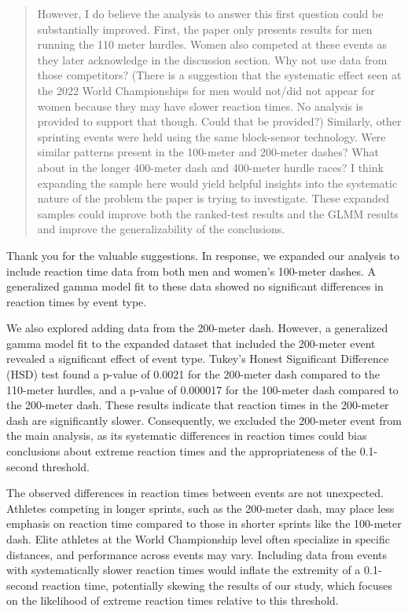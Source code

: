 \documentclass[12pt]{article}
\newenvironment{comment}%
{\begin{quotation}\noindent\small\it\color{darkblue}\ignorespaces%
}{\end{quotation}}
\begin{document}
\begin{comment}
However, I do believe the analysis to answer this first question could be
substantially improved. First, the paper only presents results for men running
the 110 meter hurdles. Women also competed at these events as they later
acknowledge in the discussion section. Why not use data from those competitors?
(There is a suggestion that the systematic effect seen at the 2022 World
Championships for men would not/did not appear for women because they may have
slower reaction times. No analysis is provided to support that though. Could
that be provided?) Similarly, other sprinting events were held using the same
block-sensor technology. Were similar patterns present in the 100-meter and
200-meter dashes? What about in the longer 400-meter dash and 400-meter hurdle
races? I think expanding the sample here would yield helpful insights into the
systematic nature of the problem the paper is trying to investigate. These
expanded samples could improve both the ranked-test results and the GLMM results
and improve the generalizability of the conclusions.
\end{comment}


Thank you for the valuable suggestions. In response, we expanded our
analysis to include reaction time data from both men and women's
100-meter dashes. A generalized gamma model fit to these data showed
no significant differences in reaction times by event type.


We also explored adding data from the 200-meter dash. However, a
generalized gamma model fit to the expanded dataset that included the
200-meter event revealed a significant effect of event type. Tukey’s
Honest Significant Difference (HSD) test found a p-value of 0.0021 for
the 200-meter dash compared to the 110-meter hurdles, and a p-value of
0.000017 for the 100-meter dash compared to the 200-meter dash.
These results indicate that reaction times in the 200-meter dash are
significantly slower. Consequently, we excluded the 200-meter event
from the main analysis, as its systematic differences in reaction
times could bias conclusions about extreme reaction times and the
appropriateness of the 0.1-second threshold.


The observed differences in reaction times between events are not
unexpected. Athletes competing in longer sprints, such as the
200-meter dash, may place less emphasis on reaction time compared to
those in shorter sprints like the 100-meter dash. Elite athletes at
the World Championship level often specialize in specific distances,
and performance across events may vary. Including data from events
with systematically slower reaction times would inflate the extremity
of a 0.1-second reaction time, potentially skewing the results of our
study, which focuses on the likelihood of extreme reaction times
relative to this threshold.
\end{document}
